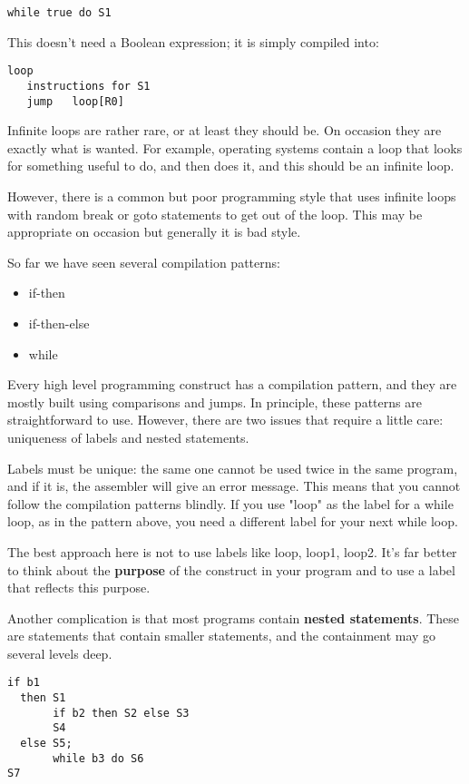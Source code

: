\documentclass[11pt]{article}
\begin{document}
\begin{itemize}
\begin{verbatim}
while true do S1
\end{verbatim}

This doesn't need a Boolean expression; it is simply compiled into:

\begin{verbatim}
loop
   instructions for S1
   jump   loop[R0] 
\end{verbatim}

Infinite loops are rather rare, or at least they should be.  On
occasion they are exactly what is wanted.  For example, operating
systems contain a loop that looks for something useful to do, and then
does it, and this should be an infinite loop.

However, there is a common but poor programming style that uses
infinite loops with random break or goto statements to get out of the
loop.  This may be appropriate on occasion but generally it is bad
style.

So far we have seen several compilation patterns:

\begin{itemize}
\item if-then
\item if-then-else
\item while
\end{itemize}

Every high level programming construct has a compilation pattern, and
they are mostly built using comparisons and jumps.  In principle,
these patterns are straightforward to use.  However, there are two
issues that require a little care: uniqueness of labels and nested
statements.

Labels must be unique: the same one cannot be used twice in the same
program, and if it is, the assembler will give an error message.
This means that you cannot follow the compilation patterns blindly.
If you use "loop" as the label for a while loop, as in the pattern
above, you need a different label for your next while loop.

The best approach here is not to use labels like loop, loop1, loop2.
It's far better to think about the \textbf{purpose} of the construct in your
program and to use a label that reflects this purpose.

Another complication is that most programs contain \textbf{nested
statements}.  These are statements that contain smaller statements,
and the containment may go several levels deep.

\begin{verbatim}
if b1
  then S1
       if b2 then S2 else S3
       S4
  else S5;
       while b3 do S6
S7
\end{verbatim}


\end{itemize}
\end{document}
